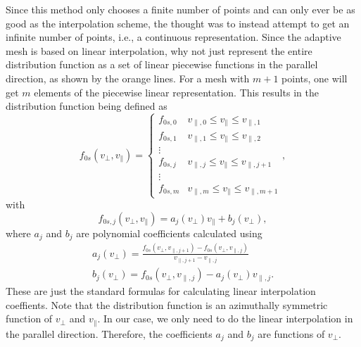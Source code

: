 Since this method only chooses a finite number of points and can only ever be as good as the interpolation scheme, 
the thought was to instead attempt to get an infinite number of points, i.e., a continuous representation.
Since the adaptive mesh is based on linear interpolation, why not just represent the entire distribution function as a set of linear piecewise functions in the parallel direction, as shown by the orange lines.
For a mesh with $m+1$ points, one will get $m$ elements of the piecewise linear representation.
This results in the distribution function being defined as
\begin{equation}
	f_{0s}(v_\perp,v_\parallel) = 
	\begin{cases}
		f_{0s,0} & v_{\parallel,0} \leq v_\parallel \leq v_{\parallel,1} \\
		f_{0s,1} & v_{\parallel,1} \leq v_\parallel \leq v_{\parallel,2} \\
		\vdots  & \ \\
		f_{0s,j} & v_{\parallel,j} \leq v_\parallel \leq v_{\parallel,j+1} \\
		\vdots & \\
		f_{0s,m} & v_{\parallel,m} \leq v_\parallel \leq v_{\parallel,m+1} 
	\end{cases},
	\label{eq:fLinearFull}
\end{equation}
with
\begin{equation}
	f_{0s,j} (v_\perp, v_\parallel) = a_j(v_\perp) v_\parallel + b_j (v_\perp),
	\label{eq:fLinear}
\end{equation}
where $a_j$ and $b_j$ are polynomial coefficients calculated using
\begin{align}
	a_j(v_\perp) = \frac{f_{0s}(v_\perp, v_{\parallel,j+1}) - f_{0s}(v_\perp, v_{\parallel,j})}{v_{\parallel,j+1}-v_{\parallel,j}}
	\label{eq:aCoeff} \\
	b_j(v_\perp) = f_{0s}(v_\perp, v_{\parallel,j}) - a_j(v_\perp) v_{\parallel,j}.
	\label{eq:bCoeff}
\end{align}
These are just the standard formulas for calculating linear interpolation coeffients. 
Note that the distribution function is an azimuthally symmetric function of $v_\perp$ and $v_\parallel$.
In our case, we only need to do the linear interpolation in the parallel direction.
Therefore, the coefficients $a_j$ and $b_j$ are functions of $v_\perp$.

